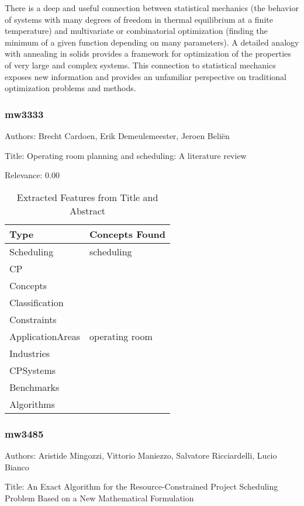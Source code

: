  There is a deep and useful connection between statistical mechanics (the behavior of systems with many degrees of freedom in thermal equilibrium at a finite temperature) and multivariate or combinatorial optimization (finding the minimum of a given function depending on many parameters). A detailed analogy with annealing in solids provides a framework for optimization of the properties of very large and complex systems. This connection to statistical mechanics exposes new information and provides an unfamiliar perspective on traditional optimization problems and methods. 

\subsubsection{mw3333}
\label{mw:mw3333}

Authors: Brecht Cardoen, Erik Demeulemeester, Jeroen Beliën

Title: Operating room planning and scheduling: A literature review

Relevance:  0.00

{\scriptsize
\begin{longtable}{p{2cm}p{20cm}}
\caption{Extracted Features from Title and Abstract}\\ \toprule
Type & Concepts Found\\ \midrule
\endhead
\bottomrule
\endfoot
Scheduling & scheduling\\ 
CP & \\ 
Concepts & \\ 
Classification & \\ 
Constraints & \\ 
ApplicationAreas & operating room\\ 
Industries & \\ 
CPSystems & \\ 
Benchmarks & \\ 
Algorithms & \\ 
\end{longtable}
}



\subsubsection{mw3485}
\label{mw:mw3485}

Authors: Aristide Mingozzi, Vittorio Maniezzo, Salvatore Ricciardelli, Lucio Bianco

Title: An Exact Algorithm for the Resource-Constrained Project Scheduling Problem Based on a New Mathematical Formulation

